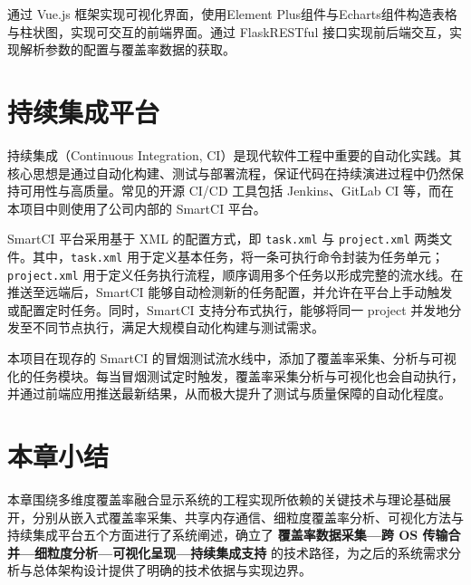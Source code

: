     通过 Vue.js 框架\cite{VueDoc2025}实现可视化界面，使用Element Plus组件\cite{ElementPlus2025}与Echarts组件\cite{EChartsGetStarted2025}构造表格与柱状图，实现可交互的前端界面。通过 FlaskRESTful \cite{FlaskRESTful2025}接口实现前后端交互，实现解析参数的配置与覆盖率数据的获取。

\section{持续集成平台}
    持续集成（Continuous Integration, CI）\cite{Dalton2019}是现代软件工程中重要的自动化实践。其核心思想是通过自动化构建、测试与部署流程，保证代码在持续演进过程中仍然保持可用性与高质量。常见的开源 CI/CD 工具包括 Jenkins、GitLab CI 等，而在本项目中则使用了公司内部的 SmartCI 平台。

    SmartCI 平台采用基于 XML 的配置方式，即 \verb|task.xml| 与 \verb|project.xml| 两类文件。其中，\verb|task.xml| 用于定义基本任务，将一条可执行命令封装为任务单元；\verb|project.xml| 用于定义任务执行流程，顺序调用多个任务以形成完整的流水线。在推送至远端后，SmartCI 能够自动检测新的任务配置，并允许在平台上手动触发或配置定时任务。同时，SmartCI 支持分布式执行，能够将同一 project 并发地分发至不同节点执行，满足大规模自动化构建与测试需求。

    本项目在现存的 SmartCI 的冒烟测试流水线中，添加了覆盖率采集、分析与可视化的任务模块。每当冒烟测试定时触发，覆盖率采集分析与可视化也会自动执行，并通过前端应用推送最新结果，从而极大提升了测试与质量保障的自动化程度。

\section{本章小结}
    本章围绕多维度覆盖率融合显示系统的工程实现所依赖的关键技术与理论基础展开，分别从嵌入式覆盖率采集、共享内存通信、细粒度覆盖率分析、可视化方法与持续集成平台五个方面进行了系统阐述，确立了\textbf{ 覆盖率数据采集—跨 OS 传输合并—细粒度分析—可视化呈现—持续集成支持 }的技术路径，为之后的系统需求分析与总体架构设计提供了明确的技术依据与实现边界。
